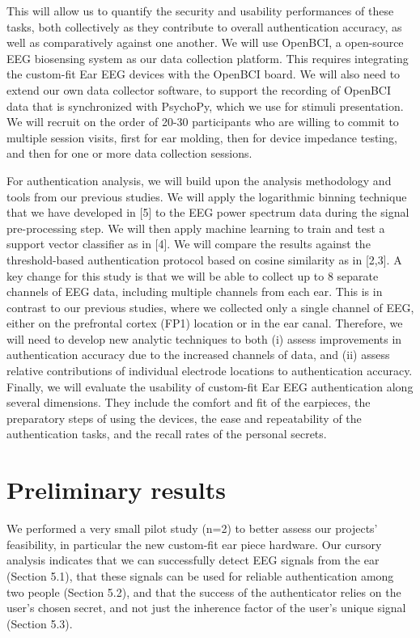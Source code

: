 \documentclass[11pt]{article}
\begin{document}
This will allow us to quantify the security and usability performances of these
tasks, both collectively as they contribute to overall authentication accuracy, as
well as comparatively against one another.
We will use OpenBCI, a open-source EEG biosensing system as our data
collection platform. This requires integrating the custom-fit Ear EEG devices with
the OpenBCI board. We will also need to extend our own data collector
software, to support the recording of OpenBCI data that is synchronized with
PsychoPy, which we use for stimuli presentation. We will recruit on the order of
20-30 participants who are willing to commit to multiple session visits, first for ear
molding, then for device impedance testing, and then for one or more data
collection sessions.

For authentication analysis, we will build upon the analysis methodology and
tools from our previous studies. We will apply the logarithmic binning technique
that we have developed in [5] to the EEG power spectrum data during the signal
pre-processing step. We will then apply machine learning to train and test a
support vector classifier as in [4]. We will compare the results against the
threshold-based authentication protocol based on cosine similarity as in [2,3].
A key change for this study is that we will be able to collect up to 8 separate
channels of EEG data, including multiple channels from each ear. This is in
contrast to our previous studies, where we collected only a single channel of
EEG, either on the prefrontal cortex (FP1) location or in the ear canal. Therefore,
we will need to develop new analytic techniques to both (i) assess improvements
in authentication accuracy due to the increased channels of data, and (ii) assess
relative contributions of individual electrode locations to authentication accuracy.
Finally, we will evaluate the usability of custom-fit Ear EEG authentication along
several dimensions. They include the comfort and fit of the earpieces, the
preparatory steps of using the devices, the ease and repeatability of the
authentication tasks, and the recall rates of the personal secrets.
\section{Preliminary results}
\label{sec:org914f392}

We performed a very small pilot study (n=2) to better assess our projects' feasibility,
in particular the new custom-fit ear piece hardware.
Our cursory analysis indicates that we can successfully
detect EEG signals from the ear (Section 5.1), that these signals can be used
for reliable authentication among two people (Section 5.2), and that the success
of the authenticator relies on the user's chosen secret, and not just the inherence
factor of the user's unique signal (Section 5.3).
\end{document}
